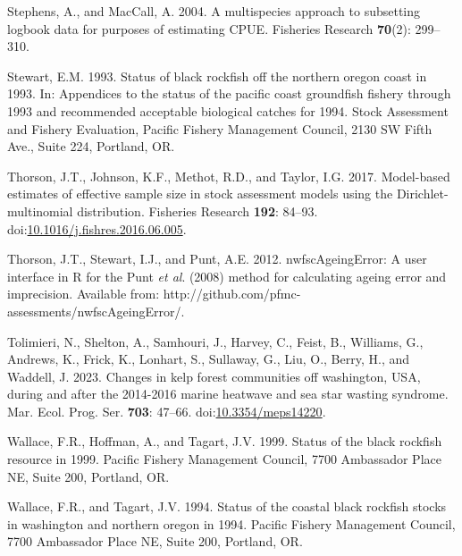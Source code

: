 \documentclass[11pt,
  letterpaper,
]{article}
\newlength{\cslhangindent}
\newenvironment{CSLReferences}[2] %
 {%
  \setlength{\parindent}{0pt}
  \ifodd #1 \everypar{\setlength{\hangindent}{\cslhangindent}}\ignorespaces\fi
  \ifnum #2 > 0
  \setlength{\parskip}{#2\baselineskip}
  \fi
 }%
 {}
\begin{document}
\begin{CSLReferences}{1}{0}
\leavevmode{}%
Stephens, A., and MacCall, A. 2004. A multispecies approach to subsetting logbook data for purposes of estimating {CPUE}. Fisheries Research \textbf{70}(2): 299--310.

\leavevmode{}%
Stewart, E.M. 1993. Status of black rockfish off the northern oregon coast in 1993. In: Appendices to the status of the pacific coast groundfish fishery through 1993 and recommended acceptable biological catches for 1994. Stock Assessment and Fishery Evaluation, Pacific Fishery Management Council, 2130 SW Fifth Ave., Suite 224, Portland, OR.

\leavevmode{}%
Thorson, J.T., Johnson, K.F., Methot, R.D., and Taylor, I.G. 2017. Model-based estimates of effective sample size in stock assessment models using the {Dirichlet}-multinomial distribution. Fisheries Research \textbf{192}: 84--93. doi:\href{https://doi.org/10.1016/j.fishres.2016.06.005}{10.1016/j.fishres.2016.06.005}.

\leavevmode{}%
Thorson, J.T., Stewart, I.J., and Punt, A.E. 2012. {nwfscAgeingError}: A user interface in {R} for the {P}unt \emph{et al}. (2008) method for calculating ageing error and imprecision. Available from: http://github.com/pfmc-assessments/nwfscAgeingError/.

\leavevmode{}%
Tolimieri, N., Shelton, A., Samhouri, J., Harvey, C., Feist, B., Williams, G., Andrews, K., Frick, K., Lonhart, S., Sullaway, G., Liu, O., Berry, H., and Waddell, J. 2023. Changes in kelp forest communities off washington, {USA}, during and after the 2014-2016 marine heatwave and sea star wasting syndrome. Mar. Ecol. Prog. Ser. \textbf{703}: 47--66. doi:\href{https://doi.org/10.3354/meps14220}{10.3354/meps14220}.

\leavevmode{}%
Wallace, F.R., Hoffman, A., and Tagart, J.V. 1999. Status of the black rockfish resource in 1999. Pacific Fishery Management Council, 7700 Ambassador Place NE, Suite 200, Portland, OR.

\leavevmode{}%
Wallace, F.R., and Tagart, J.V. 1994. Status of the coastal black rockfish stocks in washington and northern oregon in 1994. Pacific Fishery Management Council, 7700 Ambassador Place NE, Suite 200, Portland, OR.


\end{CSLReferences}
\end{document}
